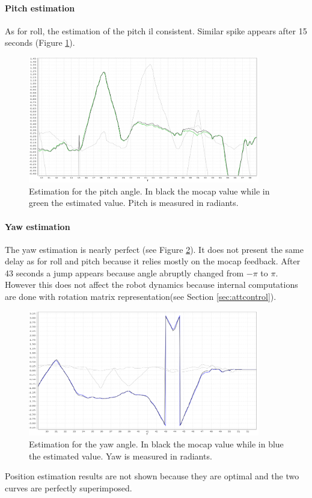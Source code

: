 \paragraph{Pitch estimation}

As for roll, the estimation of the pitch il consistent. Similar spike appears after 15 seconds (Figure \ref{figure:pitchesti}).

\begin{figure}[h]
	\centering
	\noindent
	\includegraphics[width=0.9\textwidth]{pitch_esti.png}
	\caption[Pitch estimation]{Estimation for the pitch angle. In black the mocap value while in green the estimated value. Pitch is measured in radiants.}
	\label{figure:pitchesti}
\end{figure}


\paragraph{Yaw estimation}

The yaw estimation is nearly perfect (see Figure \ref{figure:yawesti}). It does not present the same delay as for roll and pitch because it relies mostly on the mocap feedback. After 43 seconds a jump appears because angle abruptly changed from $-\pi$ to $\pi$. However this does not affect the robot dynamics because internal computations are done with rotation matrix representation(see Section \ref{sec:attcontrol}).

\begin{figure}[H]
	\centering
	\noindent
	\includegraphics[width=0.9\textwidth]{yaw_esti.png}
	\caption[Yaw estimation]{Estimation for the yaw angle. In black the mocap value while in blue the estimated value. Yaw is measured in radiants.}
	\label{figure:yawesti}
\end{figure}
\noindent
Position estimation results are not shown because they are optimal and the two curves are perfectly superimposed.

